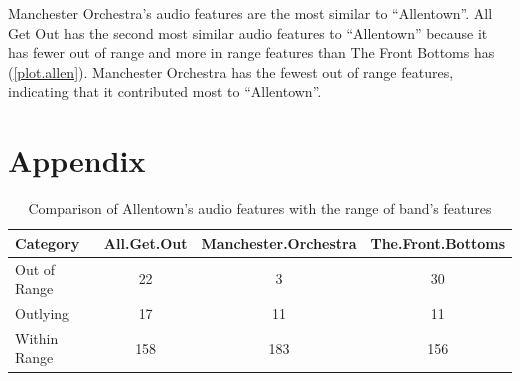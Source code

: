 \documentclass{article}\usepackage[]{graphicx}\usepackage[]{xcolor}
\begin{document}
\begin{multicols}{2}
Manchester Orchestra's audio features are the most similar to ``Allentown''. All Get Out has the second most similar audio features to ``Allentown'' because it has fewer out of range and more in range features than The Front Bottoms has (\ref{plot.allen}). Manchester Orchestra has the fewest out of range features, indicating that it contributed most to ``Allentown''.

\vspace{2em}
\begin{tiny}

\end{tiny}
\end{multicols}

\newpage
\onecolumn
\section{Appendix}
\begin{table}[ht]
\centering
\begin{tabular}{|l|c|c|c|}
  \hline
Category & All.Get.Out & Manchester.Orchestra & The.Front.Bottoms \\ 
  \hline
Out of Range &  22 &   3 &  30 \\ 
  Outlying &  17 &  11 &  11 \\ 
  Within Range & 158 & 183 & 156 \\ 
   \hline
\end{tabular}
\caption{Comparison of Allentown's audio features with the range of band's features} 
\label{allentown.tab}
\end{table}
\end{document}
